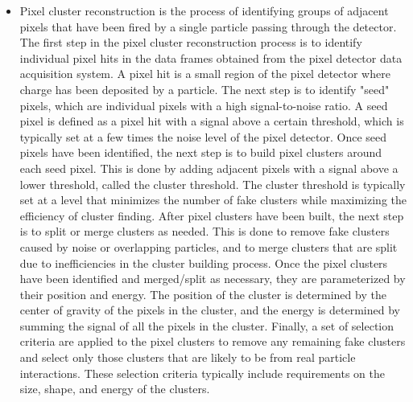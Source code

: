 \begin{itemize}
\item Pixel cluster reconstruction is the process of identifying groups of adjacent pixels that have been fired by a single particle passing through the detector. The first step in the pixel cluster reconstruction process is to identify individual pixel hits in the data frames obtained from the pixel detector data acquisition system. A pixel hit is a small region of the pixel detector where charge has been deposited by a particle. The next step is to identify "seed" pixels, which are individual pixels with a high signal-to-noise ratio. A seed pixel is defined as a pixel hit with a signal above a certain threshold, which is typically set at a few times the noise level of the pixel detector. Once seed pixels have been identified, the next step is to build pixel clusters around each seed pixel. This is done by adding adjacent pixels with a signal above a lower threshold, called the cluster threshold. The cluster threshold is typically set at a level that minimizes the number of fake clusters while maximizing the efficiency of cluster finding. After pixel clusters have been built, the next step is to split or merge clusters as needed. This is done to remove fake clusters caused by noise or overlapping particles, and to merge clusters that are split due to inefficiencies in the cluster building process. Once the pixel clusters have been identified and merged/split as necessary, they are parameterized by their position and energy. The position of the cluster is determined by the center of gravity of the pixels in the cluster, and the energy is determined by summing the signal of all the pixels in the cluster. Finally, a set of selection criteria are applied to the pixel clusters to remove any remaining fake clusters and select only those clusters that are likely to be from real particle interactions. These selection criteria typically include requirements on the size, shape, and energy of the clusters.


\end{itemize}
